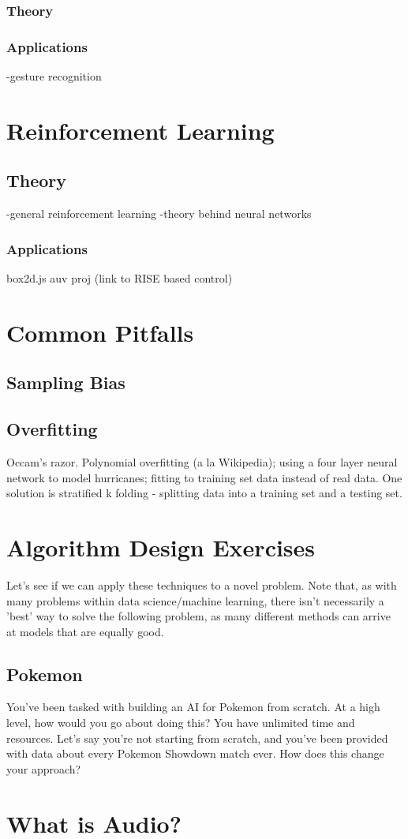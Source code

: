 \documentclass[11pt]{article}
\begin{document}
\subsubsection{Theory}
\subsubsection{Applications}
-gesture recognition

\section{Reinforcement Learning}
\subsection{Theory}
-general reinforcement learning
-theory behind neural networks
\subsubsection{Applications}
box2d.js
auv proj (link to RISE based control)

\section{Common Pitfalls}
\subsection{Sampling Bias}
\subsection{Overfitting}
Occam's razor. Polynomial overfitting (a la Wikipedia); using a four layer neural network to model hurricanes; fitting to training set data instead of real data.
One solution is stratified k folding - splitting data into a training set and a testing set.

\section{Algorithm Design Exercises}
Let's see if we can apply these techniques to a novel problem. Note that, as with many problems within data science/machine learning, there isn't necessarily a 'best' way to solve the following problem, as many different methods can arrive at models that are equally good.
\subsection{Pokemon}
You've been tasked with building an AI for Pokemon from scratch. At a high level, how would you go about doing this? You have unlimited time and resources. 
Let's say you're not starting from scratch, and you've been provided with data about every Pokemon Showdown match ever. How does this change your approach?

\section{What is Audio?}
\end{document}
